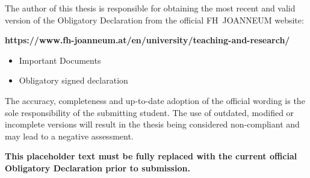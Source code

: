 %

\thispagestyle{empty}
{\hfill\fontfamily{\sfdefault}\bfseries\fontsize{22}{22}\selectfont{Declaration of Honour}}\vspace*{1cm}

\noindent The author of this thesis is responsible for obtaining the most recent and valid version
of the Obligatory Declaration from the official FH~JOANNEUM website:

\begin{center}
    \textbf{https://www.fh-joanneum.at/en/university/teaching-and-research/}
	\begin{itemize}
		\item Important Documents
		\item Obligatory signed declaration
	\end{itemize}	
\end{center}

\noindent The accuracy, completeness and up-to-date adoption of the official wording is the sole responsibility
of the submitting student. The use of outdated, modified or incomplete versions will result in the thesis being
considered non-compliant and may lead to a negative assessment.

\vspace{8mm}
\noindent\textbf{This placeholder text must be fully replaced with the current official Obligatory Declaration prior to submission.}

\vfill

\ifthenelse{\equal{\Style}{\Book}}
{
	\newpage\null\thispagestyle{empty}\newpage
}
{
}
